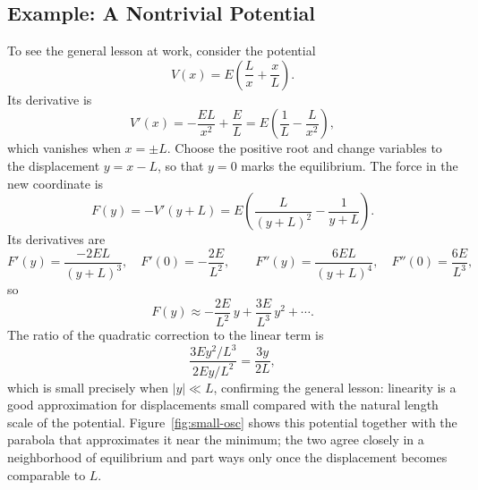 \subsection{Example: A Nontrivial Potential}

To see the general lesson at work, consider the potential
\begin{equation}
    V(x) = E\!\left(\frac{L}{x} + \frac{x}{L}\right).
\end{equation}
Its derivative is
\begin{equation}
    V'(x) = -\frac{EL}{x^2} + \frac{E}{L} = E\!\left(\frac{1}{L} - \frac{L}{x^2}\right),
\end{equation}
which vanishes when $x = \pm L$. Choose the positive root and change variables to the displacement $y = x - L$, so that $y = 0$ marks the equilibrium. The force in the new coordinate is
\begin{equation}
    F(y) = -V'(y+L) = E\!\left(\frac{L}{(y+L)^2} - \frac{1}{y+L}\right).
\end{equation}
Its derivatives are
\begin{equation}
    F'(y) = \frac{-2EL}{(y+L)^3}, \quad F'(0) = -\frac{2E}{L^2}, \qquad
    F''(y) = \frac{6EL}{(y+L)^4}, \quad F''(0) = \frac{6E}{L^3},
\end{equation}
so
\begin{equation}
    F(y) \approx -\frac{2E}{L^2}\,y + \frac{3E}{L^3}\,y^2 + \cdots.
\end{equation}
The ratio of the quadratic correction to the linear term is
\begin{equation}
    \frac{3E y^2 / L^3}{2E y / L^2} = \frac{3y}{2L},
\end{equation}
which is small precisely when $|y| \ll L$, confirming the general lesson: linearity is a good approximation for displacements small compared with the natural length scale of the potential. Figure~\ref{fig:small-osc} shows this potential together with the parabola that approximates it near the minimum; the two agree closely in a neighborhood of equilibrium and part ways only once the displacement becomes comparable to $L$.

